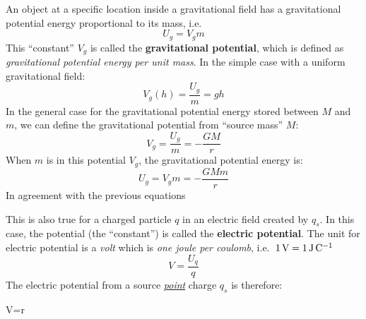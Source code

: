 An object at a specific location inside a gravitational field has a
gravitational potential energy proportional to its mass, i.e.\
\begin{equation}
    U_g=V_gm
\end{equation}
This ``constant'' $V_g$ is called the \textbf{gravitational potential}, which
is defined as \emph{gravitational potential energy per unit mass}. In the
simple case with a uniform gravitational field:
\begin{equation}
  V_g(h)=\frac{U_g}m=gh
\end{equation}
In the general case for the gravitational potential energy stored between
$M$ and $m$, we can define the gravitational potential from ``source mass''
$M$:
\begin{equation}
  V_g=\frac{U_g}m=-\frac{GM}r
\end{equation}
When $m$ is in this potential $V_g$, the gravitational potential energy is:
\begin{equation}
  U_g=V_gm=-\frac{GMm}r
\end{equation}
In agreement with the previous equations


This is also true for a charged particle $q$ in an electric field
created by $q_s$. In this case, the potential (the ``constant'') is called the
\textbf{electric potential}. The unit for electric potential is a \emph{volt}
which is \emph{one joule per coulomb}, i.e.\
$\SI1\volt=\SI1{\joule\per\coulomb}$
\begin{equation}
  \boxed{
    V=\frac{U_q}q
  }
\end{equation}
The electric potential from a source \underline{\emph{point}} charge $q_s$ is
therefore:
\begin{important-equation}
  V=r
  \quad{}
\end{important-equation}




  
\begin{center}
  \centering
\end{center}

